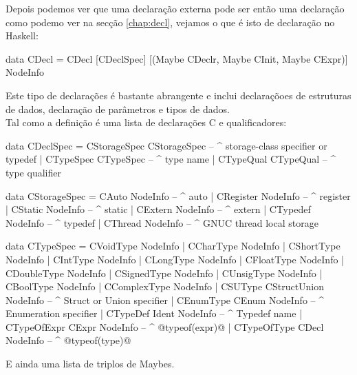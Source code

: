 Depois podemos ver que uma declaração externa pode ser então uma declaração como podemo ver na secção \ref{chap:decl}, vejamos o que é isto de declaração no \textrm{Haskell}:
\begin{haskell}
data CDecl = CDecl [CDeclSpec] [(Maybe CDeclr, Maybe CInit, Maybe CExpr)] NodeInfo
\end{haskell}
Este tipo de declarações é bastante abrangente e inclui declaraçõoes de estruturas de dados, declaração de parâmetros e tipos de dados.\\

Tal como  a definição é uma lista de declarações C e qualificadores:
\begin{haskell}
data CDeclSpec = CStorageSpec CStorageSpec  -- ^ storage-class specifier or typedef
               | CTypeSpec    CTypeSpec     -- ^ type name
               | CTypeQual    CTypeQual     -- ^ type qualifier

data CStorageSpec = CAuto     NodeInfo     -- ^ auto
                  | CRegister NodeInfo     -- ^ register
                  | CStatic   NodeInfo     -- ^ static
                  | CExtern   NodeInfo     -- ^ extern
                  | CTypedef  NodeInfo     -- ^ typedef
                  | CThread   NodeInfo     -- ^ GNUC thread local storage

data CTypeSpec = CVoidType    NodeInfo
               | CCharType    NodeInfo
               | CShortType   NodeInfo
               | CIntType     NodeInfo
               | CLongType    NodeInfo
               | CFloatType   NodeInfo
               | CDoubleType  NodeInfo
               | CSignedType  NodeInfo
               | CUnsigType   NodeInfo
               | CBoolType    NodeInfo
               | CComplexType NodeInfo
               | CSUType      CStructUnion NodeInfo  -- ^ Struct or Union specifier
               | CEnumType    CEnum        NodeInfo  -- ^ Enumeration specifier
               | CTypeDef     Ident        NodeInfo  -- ^ Typedef name
               | CTypeOfExpr  CExpr        NodeInfo  -- ^ @typeof(expr)@
               | CTypeOfType  CDecl        NodeInfo  -- ^ @typeof(type)@
\end{haskell}

E ainda uma lista de triplos de \textrm{Maybe}s.
